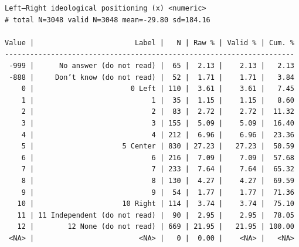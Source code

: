 \documentclass[
  letterpaper,
  DIV=11,
  numbers=noendperiod]{scrreprt}
\newenvironment{Shaded}{\begin{snugshade}}{\end{snugshade}}
\newcommand{\FunctionTok}[1]{\textcolor[rgb]{0.28,0.35,0.67}{#1}}
\newcommand{\NormalTok}[1]{\textcolor[rgb]{0.00,0.23,0.31}{#1}}
\newcommand{\SpecialCharTok}[1]{\textcolor[rgb]{0.37,0.37,0.37}{#1}}
\begin{document}
\begin{Shaded}
\end{Shaded}

\begin{verbatim}
Left–Right ideological positioning (x) <numeric> 
# total N=3048 valid N=3048 mean=-29.80 sd=184.16

Value |                        Label |   N | Raw % | Valid % | Cum. %
---------------------------------------------------------------------
 -999 |      No answer (do not read) |  65 |  2.13 |    2.13 |   2.13
 -888 |     Don’t know (do not read) |  52 |  1.71 |    1.71 |   3.84
    0 |                       0 Left | 110 |  3.61 |    3.61 |   7.45
    1 |                            1 |  35 |  1.15 |    1.15 |   8.60
    2 |                            2 |  83 |  2.72 |    2.72 |  11.32
    3 |                            3 | 155 |  5.09 |    5.09 |  16.40
    4 |                            4 | 212 |  6.96 |    6.96 |  23.36
    5 |                     5 Center | 830 | 27.23 |   27.23 |  50.59
    6 |                            6 | 216 |  7.09 |    7.09 |  57.68
    7 |                            7 | 233 |  7.64 |    7.64 |  65.32
    8 |                            8 | 130 |  4.27 |    4.27 |  69.59
    9 |                            9 |  54 |  1.77 |    1.77 |  71.36
   10 |                     10 Right | 114 |  3.74 |    3.74 |  75.10
   11 | 11 Independent (do not read) |  90 |  2.95 |    2.95 |  78.05
   12 |        12 None (do not read) | 669 | 21.95 |   21.95 | 100.00
 <NA> |                         <NA> |   0 |  0.00 |    <NA> |   <NA>
\end{verbatim}
\end{document}
